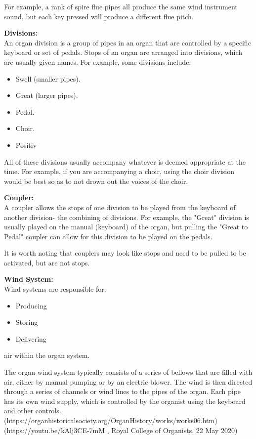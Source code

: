 For example, a rank of spire flue pipes all produce the same wind instrument sound, but each key pressed will produce a different flue pitch. 

\medskip
\noindent \textbf{Divisions:}
\\ \hspace*{0.5cm} An organ division is a group of pipes in an organ that are controlled by a specific keyboard or set of pedals. Stops of an organ are arranged into divisions, which are usually given names. For example, some divisions include:
\begin{itemize}
\item Swell (smaller pipes).
\item Great (larger pipes).
\item Pedal.
\item Choir.
\item Positiv
\end{itemize}

All of these divisions usually accompany whatever is deemed appropriate at the time. For example, if you are accompanying a choir, using the choir division would be best so as to not drown out the voices of the choir. 

\medskip
\noindent \textbf{Coupler:}
\\ \hspace*{0.5cm} A coupler allows the stops of one division to be played from the keyboard of another division- the combining of divisions. For example, the "Great" division is usually played on the manual (keyboard) of the organ, but pulling the "Great to Pedal" coupler can allow for this division to be played on the pedals.

It is worth noting that couplers may look like stops and need to be pulled to be activated, but are not stops.

\medskip
\noindent \textbf{Wind System:}
\\ \hspace*{0.5cm} Wind systems are responsible for:
\begin{itemize}
\item Producing
\item Storing
\item Delivering
\end{itemize}
air within the organ system.

The organ wind system typically consists of a series of bellows that are filled with air, either by manual pumping or by an electric blower. The wind is then directed through a series of channels or wind lines to the pipes of the organ. Each pipe has its own wind supply, which is controlled by the organist using the keyboard and other controls.
\\
(https://organhistoricalsociety.org/OrganHistory/works/works06.htm)
\\
(https://youtu.be/kAlj3CE-7mM , Royal College of Organists, 22 May 2020)

